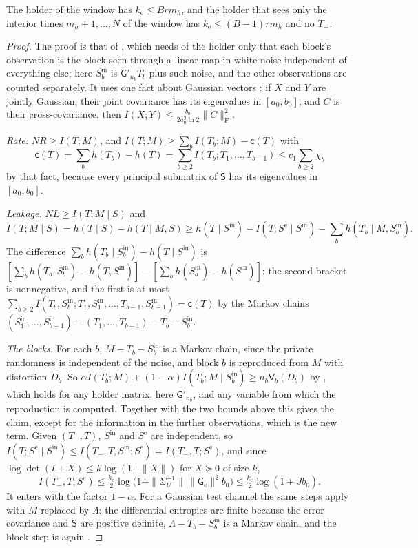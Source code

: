 \documentclass[11pt,onecolumn]{IEEEtran}
\begin{document}
The holder of the window has $k_{\mathrm e}\le Brm_h$, and the holder that
sees only the interior times $m_h+1,\dots,N$ of the window has
$k_{\mathrm e}\le(B-1)rm_h$ and no $T_-$.

\begin{proof}
The proof is that of \cite[Lemma~10]{part3}, which needs of the holder
only that each block's observation is the block seen through a linear
map in white noise independent of everything else; here
$S^{\mathrm{in}}_b$ is $\mathsf G'_{n_b}T_b$ plus such noise, and the other
observations are counted separately. It uses one fact about Gaussian
vectors \cite[Lemma~9]{part3}: if $X$ and $Y$ are jointly Gaussian, their
joint covariance has its eigenvalues in $[a_0,b_0]$, and $C$ is their
cross-covariance, then $I(X;Y)\le\tfrac{b_0}{2a_0^3\ln2}\|C\|_{\mathrm F}^2$.

\emph{Rate.} $NR\ge I(T;M)$, and
$I(T;M)\ge\sum_bI(T_b;M)-\mathsf c(T)$ with
\[
\mathsf c(T)=\sum_bh(T_b)-h(T)=\sum_{b\ge2}I(T_b;T_1,\dots,T_{b-1})\le c_1\sum_{b\ge2}\chi_b
\]
by that fact, because every principal submatrix of $\mathsf S$ has its
eigenvalues in $[a_0,b_0]$.

\emph{Leakage.} $NL\ge I(T;M\mid S)$ and
\[
I(T;M\mid S)=h(T\mid S)-h(T\mid M,S)\ge h(T\mid S^{\mathrm{in}})-I(T;S^{\mathrm e}\mid S^{\mathrm{in}})-\sum_bh(T_b\mid M,S^{\mathrm{in}}_b).
\]
The difference $\sum_bh(T_b\mid S^{\mathrm{in}}_b)-h(T\mid S^{\mathrm{in}})$ is
$[\sum_bh(T_b,S^{\mathrm{in}}_b)-h(T,S^{\mathrm{in}})]-[\sum_bh(S^{\mathrm{in}}_b)-h(S^{\mathrm{in}})]$;
the second bracket is nonnegative, and the first is at most
$\sum_{b\ge2}I(T_b,S^{\mathrm{in}}_b;T_1,S^{\mathrm{in}}_1,\dots,T_{b-1},S^{\mathrm{in}}_{b-1})=\mathsf c(T)$
by the Markov chains
$(S^{\mathrm{in}}_1,\dots,S^{\mathrm{in}}_{b-1})-(T_1,\dots,T_{b-1})-T_b-S^{\mathrm{in}}_b$.

\emph{The blocks.} For each $b$, $M-T_b-S^{\mathrm{in}}_b$ is a Markov chain,
since the private randomness is independent of the noise, and block
$b$ is reproduced from $M$ with distortion $D_b$. So
$\alpha I(T_b;M)+(1-\alpha)I(T_b;M\mid S^{\mathrm{in}}_b)\ge n_b\mathsf V_b(D_b)$ by
\cite[Proposition~2]{part1}, which holds for any holder matrix, here
$\mathsf G'_{n_b}$, and any variable from which the reproduction is
computed. Together with the two bounds above this gives the claim,
except for the information in the further observations, which is the
new term. Given $(T_-,T)$, $S^{\mathrm{in}}$ and $S^{\mathrm e}$
are independent, so
$I(T;S^{\mathrm e}\mid S^{\mathrm{in}})\le I(T_-,T,S^{\mathrm{in}};S^{\mathrm e})=I(T_-,T;S^{\mathrm e})$,
and since $\log\det(I+X)\le k\log(1+\|X\|)$ for $X\succeq0$ of size $k$,
\[
I(T_-,T;S^{\mathrm e})\le\tfrac{k_{\mathrm e}}2\log\bigl(1+\|\Sigma_U^{-1}\|\,\|\mathsf G_{\mathrm e}\|^2b_0\bigr)\le\tfrac{k_{\mathrm e}}2\log(1+\bar Jb_0).
\]
It enters with the factor $1-\alpha$. For a Gaussian test channel the
same steps apply with $M$ replaced by $\Lambda$: the differential
entropies are finite because the error covariance and $\mathsf S$ are
positive definite, $\Lambda-T_b-S^{\mathrm{in}}_b$ is a Markov chain, and the
block step is again \cite[Proposition~2]{part1}.
\end{proof}
\end{document}
